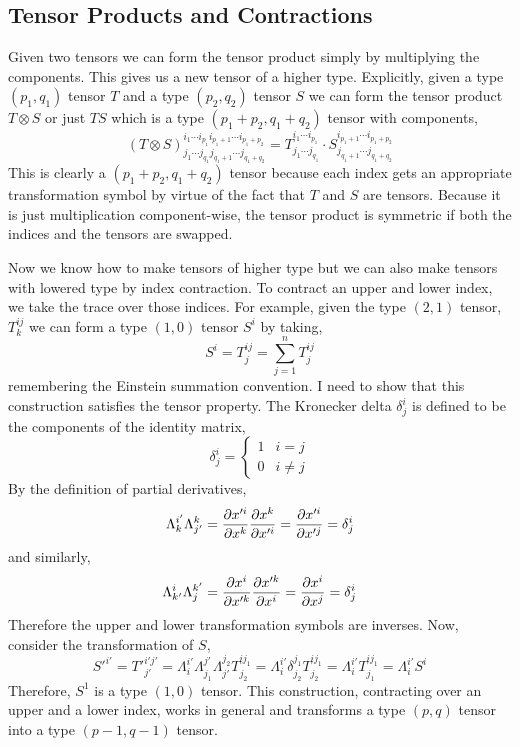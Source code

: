 \documentclass[11pt, a4paper]{article}
\begin{document}
\subsection{Tensor Products and Contractions}
Given two tensors we can form the tensor product simply by multiplying the components. This gives us a new tensor of a higher type. Explicitly, given a type $(p_1, q_1)$ tensor $T$ and a type $(p_2, q_2)$ tensor $S$ we can form the tensor product $T \otimes S$ or just $TS$ which is a type $(p_1 + p_2, q_1 + q_2)$ tensor with components,
\[ (T \otimes S)^{i_1 \cdots i_{p_1}  i_{p_1 + 1} \cdots i_{p_1 + p_2}}_{j_1 \cdots j_{q_1}  j_{q_1 + 1} \cdots j_{q_1 + q_2}} = T^{i_1 \cdots i_{p_1}}_{j_1 \cdots j_{q_1}} \cdot S^{i_{p_1 + 1} \cdots i_{p_1 + p_2}}_{j_{q_1 + 1} \cdots j_{q_1 + q_2}} \]
This is clearly a $(p_1 + p_2, q_1 + q_2)$ tensor because each index gets an appropriate transformation symbol by virtue of the fact that $T$ and $S$ are tensors. Because it is just multiplication component-wise, the tensor product is symmetric if both the indices and the tensors are swapped.  
\par
Now we know how to make tensors of higher type but we can also make tensors with lowered type by index contraction. To contract an upper and lower index, we take the trace over those indices. For example, given the type $(2,1)$ tensor, $T^{ij}_{k}$ we can form a type $(1,0)$ tensor $S^i$ by taking,
\[S^i = T^{ij}_{j} = \sum_{j = 1}^n T^{ij}_j \]
remembering the Einstein summation convention. I need to show that this construction satisfies the tensor property. The Kronecker delta $\delta^i_j$ is defined to be the components of the identity matrix,
\[ \delta^i_j = 
\begin{cases}
1 & i = j\\
0 & i \neq j
\end{cases}\]
By the definition of partial derivatives,
\[ \Lambda^{i'}_k \Lambda^{k}_{j'} = \frac{\partial{x'^i}}{\partial{x^k}} \frac{\partial{x^k}}{\partial{x'^i}} = \frac{\partial{x'^i}}{\partial{x'^j}} = \delta^i_j \]
and similarly,
\[ \Lambda^{i}_{k'} \Lambda^{k'}_{j}=  \frac{\partial{x^i}}{\partial{x'^k}} \frac{\partial{x'^k}}{\partial{x^i}}  = \frac{\partial{x^i}}{\partial{x^j}} = \delta^i_j \]
Therefore the upper and lower transformation symbols are inverses. Now, consider the transformation of $S$,
\[S'^{i'} = T'^{i'j'}_{j'} = \Lambda^{i'}_{i} \Lambda^{j'}_{j_1} \Lambda^{j_2}_{j'} T^{ij_1}_{j_2} = \Lambda^{i'}_{i} \delta^{j_1}_{j_2} T^{ij_1}_{j_2} = \Lambda^{i'}_{i} T^{ij_1}_{j_1} = \Lambda^{i'}_{i} S^{i} \]
Therefore, $S^1$ is a type $(1, 0)$ tensor. This construction, contracting over an upper and a lower index, works in general and transforms a type $(p, q)$ tensor into a type $(p-1, q-1)$ tensor. 
\end{document}
